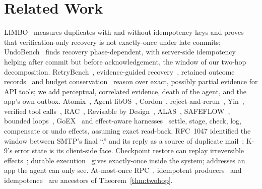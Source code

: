\section{Related Work}
\label{sec:related}

LIMBO~\cite{li2026exactlyonce} measures duplicates with and without idempotency keys and proves that verification-only recovery is not exactly-once under late commits;
UndoBench~\cite{sah2026undobench} finds recovery phase-dependent, with server-side idempotency helping after commit but before acknowledgement, the window of our two-hop
decomposition. RetryBench~\cite{liu2026retrybench}, evidence-guided recovery~\cite{zhu2026evidence}, retained outcome records~\cite{he2026kedgeflow} and budget
conservation~\cite{zhu2026budget} reason over exact, possibly partial evidence for API tools; we add perceptual, correlated evidence, death of the agent, and the app's own outbox.
Atomix~\cite{mohammadi2026atomix}, Agent libOS~\cite{zhang2026agentlibos},
Cordon~\cite{chen2026cordon}, reject-and-rerun~\cite{salas2026authority}, Yin~\cite{yin2026safety}, verified tool calls~\cite{mansoor2026verified}, RAC~\cite{perera2026rac},
Revisable by Design~\cite{zhai2026revisable}, ALAS~\cite{geng2025alas}, SAFEFLOW~\cite{li2025safeflow}, bounded loops~\cite{bhardwaj2026bounded}, GoEX~\cite{patil2024goex} and effect-aware harnesses~\cite{ma2026guardrailed,shaikh2026agentmesh,kovalenko2026effectworld,wang2026industrial}
settle, stage, check, log, compensate or undo effects, assuming exact read-back. RFC~1047 identified the window between SMTP's final ``.'' and its reply as a source of
duplicate mail~\cite{rfc1047}; K-9's error state is its client-side face. Checkpoint restore can replay irreversible effects~\cite{khan2026resume,li2025agentgit,zheng2026acrfence,wu2026safe}; durable execution~\cite{temporal_docs,langgraph_durable,burckhardt2021durable,zhang2020beldi,jia2021boki}
gives exactly-once inside the system; \sys addresses an app the agent can only see. At-most-once RPC~\cite{birrell1984rpc}, idempotent producers~\cite{wang2021kafka}
and idempotence~\cite{helland2012idempotence} are ancestors of Theorem~\ref{thm:twohop}.

